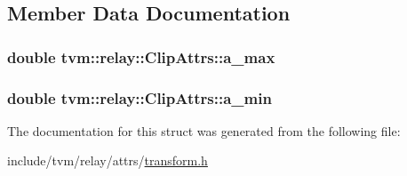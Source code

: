 \subsection{Member Data Documentation}
\subsubsection[{\texorpdfstring{a\+\_\+max}{a_max}}]{\setlength{\rightskip}{0pt plus 5cm}double tvm\+::relay\+::\+Clip\+Attrs\+::a\+\_\+max}\hypertarget{structtvm_1_1relay_1_1ClipAttrs_af469a6f2f29cca8b0780e3feb7ed0502}{}\label{structtvm_1_1relay_1_1ClipAttrs_af469a6f2f29cca8b0780e3feb7ed0502}
\subsubsection[{\texorpdfstring{a\+\_\+min}{a_min}}]{\setlength{\rightskip}{0pt plus 5cm}double tvm\+::relay\+::\+Clip\+Attrs\+::a\+\_\+min}\hypertarget{structtvm_1_1relay_1_1ClipAttrs_a8a9a5b34513d0e9b46cae1ac436c6917}{}\label{structtvm_1_1relay_1_1ClipAttrs_a8a9a5b34513d0e9b46cae1ac436c6917}


The documentation for this struct was generated from the following file\+:\begin{DoxyCompactItemize}
\item 
include/tvm/relay/attrs/\hyperlink{include_2tvm_2relay_2attrs_2transform_8h}{transform.\+h}\end{DoxyCompactItemize}
